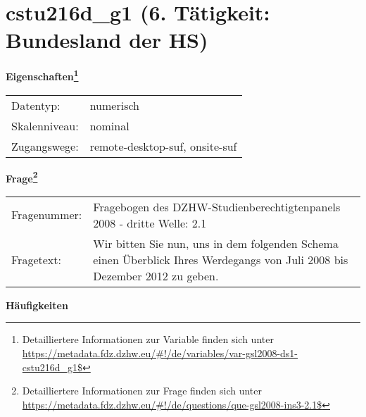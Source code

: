 
    \setcounter{footnote}{0}

    \vspace*{-1.8cm}
	\section{cstu216d\_g1 (6. Tätigkeit: Bundesland der HS)}
	\label{section:cstu216d_g1}



    \vspace*{0.5cm}
    \noindent\textbf{Eigenschaften\footnote{Detailliertere Informationen zur Variable finden sich unter
		\url{https://metadata.fdz.dzhw.eu/\#!/de/variables/var-gsl2008-ds1-cstu216d_g1$}}}\\
	\begin{tabularx}{\hsize}{@{}lX}
	Datentyp: & numerisch \\
	Skalenniveau: & nominal \\
	Zugangswege: &
	  remote-desktop-suf, 
	  onsite-suf
 \\
    \end{tabularx}



				\vspace*{0.5cm}
                \noindent\textbf{Frage\footnote{Detailliertere Informationen zur Frage finden sich unter
		              \url{https://metadata.fdz.dzhw.eu/\#!/de/questions/que-gsl2008-ins3-2.1$}}}\\
				\begin{tabularx}{\hsize}{@{}lX}
					Fragenummer: &
					  Fragebogen des DZHW-Studienberechtigtenpanels 2008 - dritte Welle:
					  2.1
 \\
					Fragetext: & Wir bitten Sie nun, uns in dem folgenden Schema einen Überblick Ihres Werdegangs von Juli 2008 bis Dezember 2012 zu geben. \\
				\end{tabularx}





        		\vspace*{0.5cm}
                \noindent\textbf{Häufigkeiten}

